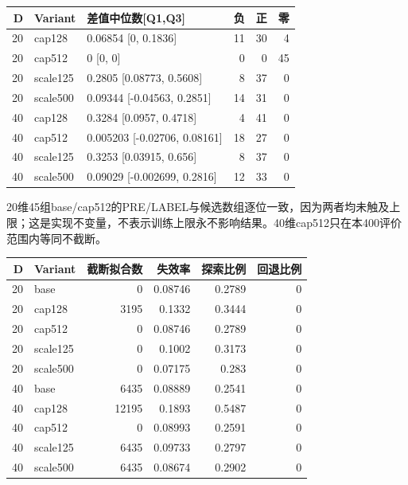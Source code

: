 \documentclass[11pt,a4paper]{article}
\begin{document}
\par\noindent\begin{minipage}{\linewidth}

\begin{longtable}[]{@{}rllrrr@{}}
\toprule
D & Variant & 差值中位数{[}Q1,Q3{]} & 负 & 正 & 零 \\
\midrule
\endhead
20 & cap128 & 0.06854 {[}0, 0.1836{]} & 11 & 30 & 4 \\
20 & cap512 & 0 {[}0, 0{]} & 0 & 0 & 45 \\
20 & scale125 & 0.2805 {[}0.08773, 0.5608{]} & 8 & 37 & 0 \\
20 & scale500 & 0.09344 {[}-0.04563, 0.2851{]} & 14 & 31 & 0 \\
40 & cap128 & 0.3284 {[}0.0957, 0.4718{]} & 4 & 41 & 0 \\
40 & cap512 & 0.005203 {[}-0.02706, 0.08161{]} & 18 & 27 & 0 \\
40 & scale125 & 0.3253 {[}0.03915, 0.656{]} & 8 & 37 & 0 \\
40 & scale500 & 0.09029 {[}-0.002699, 0.2816{]} & 12 & 33 & 0 \\
\bottomrule
\end{longtable}

\end{minipage}\par

20维45组base/cap512的PRE/LABEL与候选数组逐位一致，因为两者均未触及上限；这是实现不变量，不表示训练上限永不影响结果。40维cap512只在本400评价范围内等同不截断。

\par\noindent\begin{minipage}{\linewidth}

\begin{longtable}[]{@{}rlrrrr@{}}
\toprule
D & Variant & 截断拟合数 & 失效率 & 探索比例 & 回退比例 \\
\midrule
\endhead
20 & base & 0 & 0.08746 & 0.2789 & 0 \\
20 & cap128 & 3195 & 0.1332 & 0.3444 & 0 \\
20 & cap512 & 0 & 0.08746 & 0.2789 & 0 \\
20 & scale125 & 0 & 0.1002 & 0.3173 & 0 \\
20 & scale500 & 0 & 0.07175 & 0.283 & 0 \\
40 & base & 6435 & 0.08889 & 0.2541 & 0 \\
40 & cap128 & 12195 & 0.1893 & 0.5487 & 0 \\
40 & cap512 & 0 & 0.08993 & 0.2591 & 0 \\
40 & scale125 & 6435 & 0.09733 & 0.2797 & 0 \\
40 & scale500 & 6435 & 0.08674 & 0.2902 & 0 \\
\bottomrule
\end{longtable}

\end{minipage}\par
\end{document}
